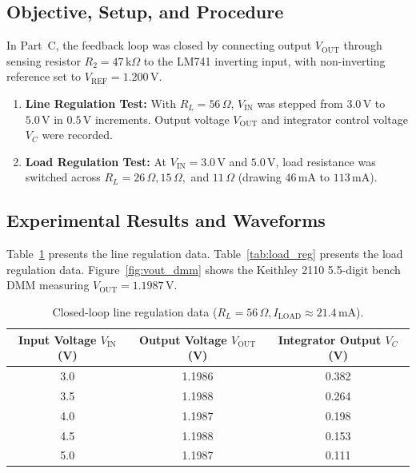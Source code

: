 \documentclass[11pt,a4paper]{article}
\begin{document}
\subsection{Objective, Setup, and Procedure}
In Part~C, the feedback loop was closed by connecting output $V_{\mathrm{OUT}}$ through sensing resistor $R_2 = 47\,\mathrm{k}\Omega$ to the LM741 inverting input, with non-inverting reference set to $V_{\mathrm{REF}} = 1.200\,\mathrm{V}$.
\begin{enumerate}
    \item \textbf{Line Regulation Test:} With $R_L = 56\,\Omega$, $V_{\mathrm{IN}}$ was stepped from $3.0\,\mathrm{V}$ to $5.0\,\mathrm{V}$ in $0.5\,\mathrm{V}$ increments. Output voltage $V_{\mathrm{OUT}}$ and integrator control voltage $V_C$ were recorded.
    \item \textbf{Load Regulation Test:} At $V_{\mathrm{IN}} = 3.0\,\mathrm{V}$ and $5.0\,\mathrm{V}$, load resistance was switched across $R_L = 26\,\Omega, 15\,\Omega,$ and $11\,\Omega$ (drawing $46\,\mathrm{mA}$ to $113\,\mathrm{mA}$).
\end{enumerate}

\subsection{Experimental Results and Waveforms}
Table~\ref{tab:line_reg} presents the line regulation data. Table~\ref{tab:load_reg} presents the load regulation data. Figure~\ref{fig:vout_dmm} shows the Keithley 2110 5.5-digit bench DMM measuring $V_{\mathrm{OUT}} = 1.1987\,\mathrm{V}$.

\begin{table}[H]
\centering
\caption{Closed-loop line regulation data ($R_L = 56\,\Omega, I_{\mathrm{LOAD}} \approx 21.4\,\mathrm{mA}$).}
\label{tab:line_reg}
\begin{tabular}{@{}ccc@{}}
\toprule
\textbf{Input Voltage $V_{\mathrm{IN}}$ (V)} & \textbf{Output Voltage $V_{\mathrm{OUT}}$ (V)} & \textbf{Integrator Output $V_C$ (V)} \\ \midrule
3.0 & 1.1986 & 0.382 \\
3.5 & 1.1988 & 0.264 \\
4.0 & 1.1987 & 0.198 \\
4.5 & 1.1988 & 0.153 \\
5.0 & 1.1987 & 0.111 \\
\bottomrule
\end{tabular}
\end{table}
\end{document}
